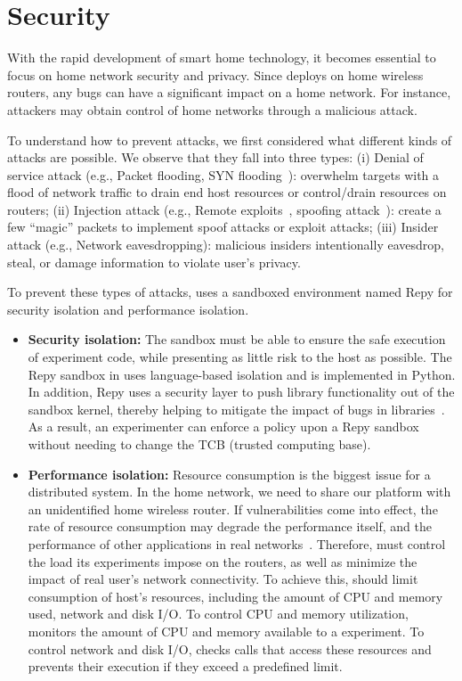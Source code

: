 \section{Security}
\label{sec.security}
With the rapid development of smart home technology, it becomes essential to focus on home network security and privacy. Since \sysname deploys on home wireless routers, any bugs can have a significant impact on a home network. For instance, attackers may obtain control of home networks through a malicious attack. 

To understand how to prevent attacks, we first considered what different kinds of attacks are possible. We observe that they fall into three types: (i) Denial of service attack (e.g., Packet flooding, SYN flooding~\cite{eddy2011syn}): overwhelm targets with a flood of network traffic to drain end host resources or control/drain resources on routers; (ii) Injection attack (e.g., Remote exploits~\cite{shellcode},  spoofing attack~\cite{bishop1996attack}): create a few ``magic'' packets to implement spoof attacks or exploit attacks; (iii) Insider attack (e.g., Network eavesdropping): malicious insiders intentionally eavesdrop, steal, or damage information to violate user's privacy.

To prevent these types of attacks, \sysname uses a sandboxed environment named Repy for security isolation and performance isolation.
 
\begin{itemize} 
\item \textbf{Security isolation:} The sandbox must be able to ensure the safe execution of experiment code, while presenting as little risk to the host as possible. The Repy sandbox in \sysname uses language-based isolation and is implemented in Python. In addition, Repy uses a security layer to push library functionality out of the sandbox kernel, thereby helping to mitigate the impact of bugs in libraries~\cite{cappos2010retaining}. As a result, an experimenter can enforce a policy upon a Repy sandbox without needing to change the TCB (trusted computing base).  
\item \textbf{Performance isolation:} Resource consumption is the biggest issue for a distributed system. In the home network, we need to share our platform with an unidentified home wireless router. If vulnerabilities come into effect\cite{joshi2013survey}, the rate of resource consumption may degrade the performance itself, and the performance of other applications in real networks~\cite{joshi2013survey}. Therefore, \sysname must control the load its experiments impose on the routers, as well as minimize the impact of real user's network connectivity. To achieve this, \sysname should limit consumption of host's resources, including the amount of CPU and memory used, network and disk I/O. To control CPU and memory utilization, \sysname monitors the amount of CPU and memory available to a experiment. To control network and disk I/O, \sysname checks calls that access these resources and prevents their execution if they exceed a predefined limit. 
\end{itemize}

